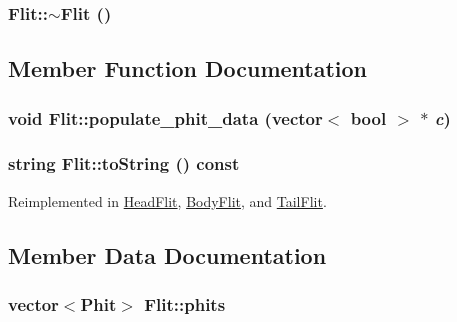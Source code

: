 \hypertarget{classFlit_6c188313705a19f7fa7dffabb6591ceb}{
\subsubsection[{$\sim$Flit}]{\setlength{\rightskip}{0pt plus 5cm}Flit::$\sim$Flit ()}}
\label{classFlit_6c188313705a19f7fa7dffabb6591ceb}




\subsection{Member Function Documentation}
\hypertarget{classFlit_c290470e490b600742672da65d4b42f0}{
\subsubsection[{populate\_\-phit\_\-data}]{\setlength{\rightskip}{0pt plus 5cm}void Flit::populate\_\-phit\_\-data (vector$<$ bool $>$ $\ast$ {\em c})}}
\label{classFlit_c290470e490b600742672da65d4b42f0}


\hypertarget{classFlit_ffc6c729a005389b51818aac59710dab}{
\subsubsection[{toString}]{\setlength{\rightskip}{0pt plus 5cm}string Flit::toString () const}}
\label{classFlit_ffc6c729a005389b51818aac59710dab}




Reimplemented in \hyperlink{classHeadFlit_4d22ac839cad2ac7ef0aedfeb54c9421}{HeadFlit}, \hyperlink{classBodyFlit_408f02aae1a229c761ff0f3537675cde}{BodyFlit}, and \hyperlink{classTailFlit_fb1c83457c5d834a8a859269154e3c4d}{TailFlit}.

\subsection{Member Data Documentation}
\hypertarget{classFlit_8f86afda1dc9b2393655bbabf7ebf42a}{
\subsubsection[{phits}]{\setlength{\rightskip}{0pt plus 5cm}vector$<${\bf Phit}$>$ {\bf Flit::phits}}}
\label{classFlit_8f86afda1dc9b2393655bbabf7ebf42a}


